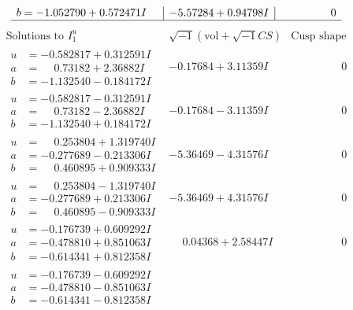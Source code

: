 \documentclass[1p]{elsarticle_modified}
\theoremstyle{definition}
\newcommand{\I}{\sqrt{-1}}
\begin{document}
$$\begin{array}{c|c|c}
\begin{aligned}
b &= -1.052790 + 0.572471 I\end{aligned}
 & -5.57284 + 0.94798 I & \phantom{-0.000000 } 0\\
 \hline 
 \end{array}$$\newpage$$\begin{array}{c|c|c}  
\text{Solutions to }I^u_{1}& \I (\text{vol} + \sqrt{-1}CS) & \text{Cusp shape}\\
 \hline 
\begin{aligned}
u &= -0.582817 + 0.312591 I \\
a &= \phantom{-}0.73182 + 2.36882 I \\
b &= -1.132540 - 0.184172 I\end{aligned}
 & -0.17684 + 3.11359 I & \phantom{-0.000000 } 0 \\ \hline\begin{aligned}
u &= -0.582817 - 0.312591 I \\
a &= \phantom{-}0.73182 - 2.36882 I \\
b &= -1.132540 + 0.184172 I\end{aligned}
 & -0.17684 - 3.11359 I & \phantom{-0.000000 } 0 \\ \hline\begin{aligned}
u &= \phantom{-}0.253804 + 1.319740 I \\
a &= -0.277689 - 0.213306 I \\
b &= \phantom{-}0.460895 + 0.909333 I\end{aligned}
 & -5.36469 - 4.31576 I & \phantom{-0.000000 } 0 \\ \hline\begin{aligned}
u &= \phantom{-}0.253804 - 1.319740 I \\
a &= -0.277689 + 0.213306 I \\
b &= \phantom{-}0.460895 - 0.909333 I\end{aligned}
 & -5.36469 + 4.31576 I & \phantom{-0.000000 } 0 \\ \hline\begin{aligned}
u &= -0.176739 + 0.609292 I \\
a &= -0.478810 + 0.851063 I \\
b &= -0.614341 + 0.812358 I\end{aligned}
 & \phantom{-}0.04368 + 2.58447 I & \phantom{-0.000000 } 0 \\ \hline\begin{aligned}
u &= -0.176739 - 0.609292 I \\
a &= -0.478810 - 0.851063 I \\
b &= -0.614341 - 0.812358 I\end{aligned}

\end{array}$$
\end{document}
